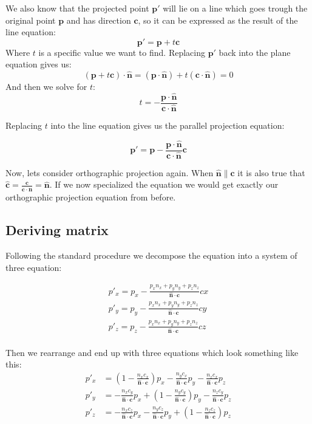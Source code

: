\documentclass[]{report}   %
\begin{document}
We also know that the projected point \(\mathbf{p\prime}\) will lie on a line which goes trough the original point \(\mathbf{p}\) and has direction \(\mathbf{c}\), so it can be expressed as the result of the line equation:
\[
	\mathbf{p\prime} = \mathbf{p} + t\mathbf{c}
\]
Where \(t\) is a specific value we want to find. Replacing \(\mathbf{p\prime}\) back into the plane equation gives us:
\[
	(\mathbf{p} + t\mathbf{c}) \cdot \mathbf{\hat{n}} = 
	(\mathbf{p} \cdot \mathbf{\hat{n}}) + t(\mathbf{c} \cdot \mathbf{\hat{n}}) = 0
\]
And then we solve for \(t\):
\[
	t = -\frac{\mathbf{p} \cdot \mathbf{\hat{n}}}{\mathbf{c} \cdot \mathbf{\hat{n}}}
\]

Replacing \(t\) into the line equation gives us the parallel projection equation:
\begin{mdframed}
\[
	\mathbf{p\prime} = \mathbf{p} - \frac{\mathbf{p} \cdot \mathbf{\hat{n}}}{\mathbf{c} \cdot \mathbf{\hat{n}}} 
	\mathbf{c}
\]
\end{mdframed}


Now, lets consider orthographic projection again. When \(\mathbf{\hat{n}} \parallel \mathbf{c}\) it is also true that \(\mathbf{\hat{c}} = \frac{\mathbf{c}}{\mathbf{c} \cdot \mathbf{\hat{n}}} = \mathbf{\hat{n}}\). If we now specialized the equation we would get exactly our orthographic projection equation from before.


\subsection{Deriving matrix}

Following the standard procedure we decompose the equation into a system of three equation:

\begin{align*}
	p\prime_x = p_x - \frac	{p_x n_x + p_y n_y + p_z n_z}
							{\mathbf{\hat{n}}\cdot\mathbf{c}} cx	\\
	p\prime_y = p_y - \frac	{p_x n_x + p_y n_y + p_z n_z}
							{\mathbf{\hat{n}}\cdot\mathbf{c}} cy	\\
	p\prime_z = p_z - \frac	{p_x n_x + p_y n_y + p_z n_z}
							{\mathbf{\hat{n}}\cdot\mathbf{c}} cz	\\
\end{align*}

Then we rearrange and end up with three equations which look something like this:
\begin{align*}
	p\prime_x &=(1 - \frac{n_x c_x}{\mathbf{\hat{n}}\cdot\mathbf{c}}) p_x 
				   - \frac{n_y c_x}{\mathbf{\hat{n}}\cdot\mathbf{c}}  p_y
				   - \frac{n_z c_x}{\mathbf{\hat{n}}\cdot\mathbf{c}}  p_z
				\\
	p\prime_y &= - \frac{n_x c_y}{\mathbf{\hat{n}}\cdot\mathbf{c}}	p_x
			+(1 - \frac{n_y c_y}{\mathbf{\hat{n}}\cdot\mathbf{c}})	p_y
				 - \frac{n_z c_y}{\mathbf{\hat{n}}\cdot\mathbf{c}}	p_z
				\\
	p\prime_z &= - \frac{n_x c_z}{\mathbf{\hat{n}}\cdot\mathbf{c}}	p_x
				 - \frac{n_y c_z}{\mathbf{\hat{n}}\cdot\mathbf{c}}	p_y
			+(1 - \frac{n_z c_z}{\mathbf{\hat{n}}\cdot\mathbf{c}})	p_z
\end{align*}
\end{document}
